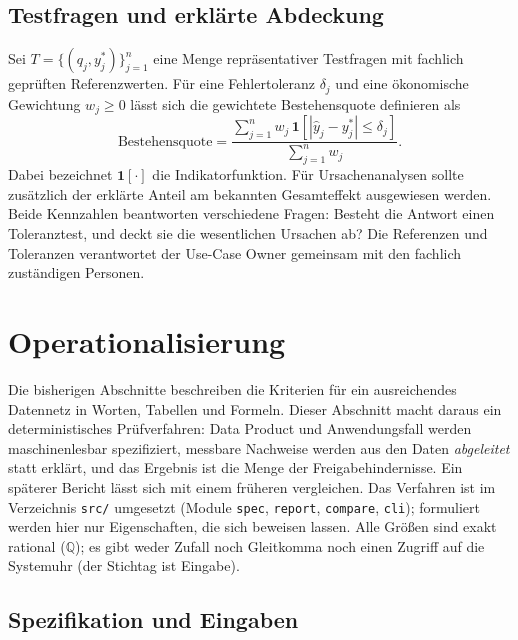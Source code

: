 \documentclass[a4paper,12pt]{article}
\theoremstyle{definition}
\newcommand{\QQ}{\mathbb{Q}}
\begin{document}
\subsection{Testfragen und erklärte Abdeckung}
Sei $T=\{(q_j,y_j^*)\}_{j=1}^n$ eine Menge repräsentativer Testfragen mit fachlich geprüften Referenzwerten. Für eine Fehlertoleranz $\delta_j$ und eine ökonomische Gewichtung $w_j\geq 0$ lässt sich die gewichtete Bestehensquote definieren als
\[
\mathrm{Bestehensquote}
=\frac{\sum_{j=1}^n w_j\,\mathbf{1}\!\left[|\hat y_j-y_j^*|\leq\delta_j\right]}
{\sum_{j=1}^n w_j}.
\]
Dabei bezeichnet $\mathbf{1}[\cdot]$ die Indikatorfunktion. Für Ursachenanalysen sollte zusätzlich der erklärte Anteil am bekannten Gesamteffekt ausgewiesen werden. Beide Kennzahlen beantworten verschiedene Fragen: Besteht die Antwort einen Toleranztest, und deckt sie die wesentlichen Ursachen ab? Die Referenzen und Toleranzen verantwortet der Use-Case Owner gemeinsam mit den fachlich zuständigen Personen.

\section{Operationalisierung}
\label{sec:operationalization}

Die bisherigen Abschnitte beschreiben die Kriterien für ein ausreichendes Datennetz in Worten, Tabellen und Formeln. Dieser Abschnitt macht daraus ein deterministisches Prüfverfahren: Data Product und Anwendungsfall werden maschinenlesbar spezifiziert, messbare Nachweise werden aus den Daten \emph{abgeleitet} statt erklärt, und das Ergebnis ist die Menge der Freigabehindernisse. Ein späterer Bericht lässt sich mit einem früheren vergleichen. Das Verfahren ist im Verzeichnis \texttt{src/} umgesetzt (Module \texttt{spec}, \texttt{report}, \texttt{compare}, \texttt{cli}); formuliert werden hier nur Eigenschaften, die sich beweisen lassen. Alle Größen sind exakt rational ($\QQ$); es gibt weder Zufall noch Gleitkomma noch einen Zugriff auf die Systemuhr (der Stichtag ist Eingabe).

\subsection{Spezifikation und Eingaben}
\end{document}

